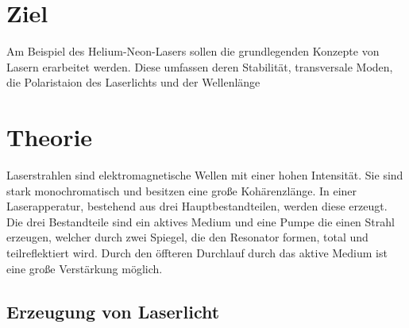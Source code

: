 \section{Ziel}
Am Beispiel des Helium-Neon-Lasers sollen die grundlegenden Konzepte von Lasern erarbeitet werden.
Diese umfassen deren Stabilität, transversale Moden, die Polaristaion des Laserlichts und der Wellenlänge

\section{Theorie}
\label{sec:Theorie}

Laserstrahlen sind elektromagnetische Wellen mit einer hohen Intensität.
Sie sind stark monochromatisch und besitzen eine große Kohärenzlänge.
In einer Laserapperatur, bestehend aus drei Hauptbestandteilen, werden diese erzeugt.
Die drei Bestandteile sind ein aktives Medium und eine Pumpe die einen Strahl erzeugen, welcher durch zwei Spiegel, die den Resonator formen, total und teilreflektiert wird.
Durch den öffteren Durchlauf durch das aktive Medium ist eine große Verstärkung möglich.

\subsection{Erzeugung von Laserlicht}


